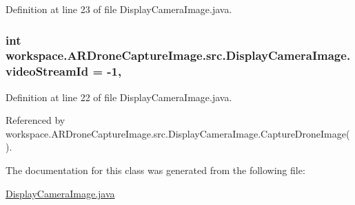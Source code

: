 Definition at line 23 of file Display\+Camera\+Image.\+java.

\hypertarget{classworkspace_1_1_a_r_drone_capture_image_1_1src_1_1_display_camera_image_aa2f5d378f7aa31734eb27fc38ed672f6}{}
\subsubsection[{video\+Stream\+Id}]{\setlength{\rightskip}{0pt plus 5cm}int workspace.\+A\+R\+Drone\+Capture\+Image.\+src.\+Display\+Camera\+Image.\+video\+Stream\+Id = -\/1\hspace{0.3cm}{\ttfamily [static]}, {\ttfamily [private]}}\label{classworkspace_1_1_a_r_drone_capture_image_1_1src_1_1_display_camera_image_aa2f5d378f7aa31734eb27fc38ed672f6}


Definition at line 22 of file Display\+Camera\+Image.\+java.



Referenced by workspace.\+A\+R\+Drone\+Capture\+Image.\+src.\+Display\+Camera\+Image.\+Capture\+Drone\+Image().



The documentation for this class was generated from the following file\+:\begin{DoxyCompactItemize}
\item 
\hyperlink{_display_camera_image_8java}{Display\+Camera\+Image.\+java}\end{DoxyCompactItemize}
